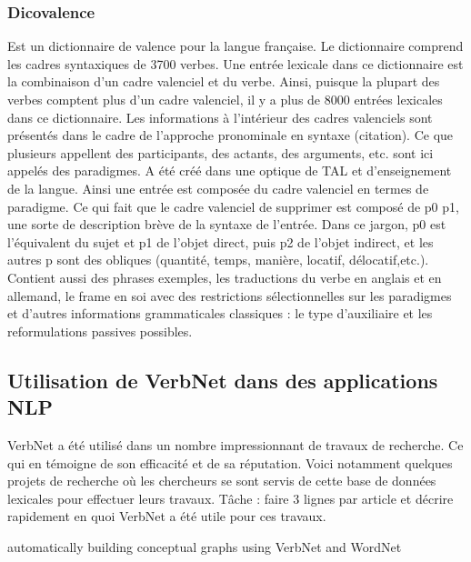 
\subsubsection{Dicovalence}

Est un dictionnaire de valence pour la langue française. Le dictionnaire comprend les cadres syntaxiques de 3700 verbes. Une entrée lexicale dans ce dictionnaire est la combinaison d'un cadre valenciel et du verbe. Ainsi, puisque la plupart des verbes comptent plus d'un cadre valenciel, il y a plus de 8000 entrées lexicales dans ce dictionnaire. Les informations à l'intérieur des cadres valenciels sont présentés dans le cadre de l'approche pronominale en syntaxe (citation). Ce que plusieurs appellent des participants, des actants, des arguments, etc. sont ici appelés des paradigmes. A été créé dans une optique de TAL et d'enseignement de la langue. Ainsi une entrée est composée du cadre valenciel en termes de paradigme. Ce qui fait que le cadre valenciel de supprimer est composé de p0 p1, une sorte de description brève de la syntaxe de l'entrée. Dans ce jargon, p0 est l'équivalent du sujet et p1 de l'objet direct, puis p2 de l'objet indirect, et les autres p sont des obliques (quantité, temps, manière, locatif, délocatif,etc.). Contient aussi des phrases exemples, les traductions du verbe en anglais et en allemand, le frame en soi avec des restrictions sélectionnelles sur les paradigmes et d'autres informations grammaticales classiques : le type d'auxiliaire et les reformulations passives possibles.

\subsection {Utilisation de VerbNet dans des applications NLP}

VerbNet a été utilisé dans un nombre impressionnant de travaux de recherche. Ce qui en témoigne de son efficacité et de sa réputation. Voici notamment quelques projets de recherche où les chercheurs se sont servis de cette base de données lexicales pour effectuer leurs travaux.
Tâche : faire 3 lignes par article et décrire rapidement en quoi VerbNet a été utile pour ces travaux.

automatically building conceptual graphs using VerbNet and WordNet

